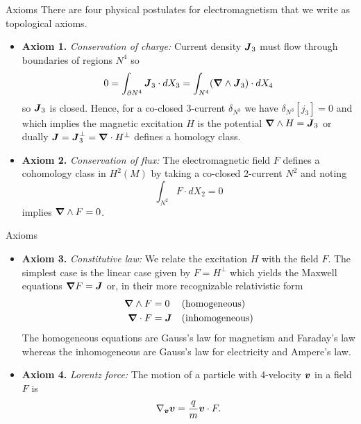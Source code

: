 \documentclass[UKenglish]{beamer}
\begin{document}
\begin{frame}{Axioms}
\vfill
There are four physical postulates for electromagnetism that we write as topological axioms.    
    \begin{itemize}
    \item{\bf{Axiom 1.}} \emph{Conservation of charge:} Current density $\boldsymbol{J}_3$ must flow through boundaries of regions $N^4$ so
    \[
    0=\int_{\partial N^4} \boldsymbol{J}_3\cdot dX_3=\int_{N^4} (\boldsymbol{\nabla} \wedge \boldsymbol{J}_3) \cdot dX_4
    \]
    so $\boldsymbol{J}_3$ is closed. Hence, for a co-closed 3-current $\delta_{N^3}$  we have $\delta_{N^3}[j_3]=0$ and which implies the magnetic excitation $H$ is the potential $\boldsymbol{\nabla} \wedge H=\boldsymbol{J}_3$ or dually $\boldsymbol{J}=\boldsymbol{J}_3^\perp = \boldsymbol{\nabla} \cdot H^\perp$ defines a homology class.
    \item{\bf{Axiom 2.}} \emph{Conservation of flux:} The electromagnetic field $F$ defines a cohomology class in $H^2(M)$ by taking a co-closed 2-current $N^2$ and noting
    \[
    \int_{N^2} F \cdot dX_2 = 0 
    \]
    implies $\boldsymbol{\nabla} \wedge F=0$.
\end{itemize}
\vfill
\end{frame}

\begin{frame}{Axioms}
\vfill
    \begin{itemize}
    \item{\bf{Axiom 3.}} \emph{Constitutive law:} We relate the excitation $H$ with the field $F$. The simplest case is the linear case given by $F=H^\perp$ which yields the Maxwell equations $\boldsymbol{\nabla} F = \boldsymbol{J}$ or, in their more recognizable relativistic form
    \begin{align*}
        \boldsymbol{\nabla} \wedge F &= 0 && \textrm{(homogeneous)}\\
        \boldsymbol{\nabla} \cdot F &= \boldsymbol{J} && \textrm{(inhomogeneous)}
    \end{align*}
    The homogeneous equations are Gauss's law for magnetism and Faraday's law whereas the inhomogeneous are Gauss's law for electricity and Ampere's law.
    \item{\bf{Axiom 4.}} \emph{Lorentz force:} The motion of a particle with 4-velocity $\boldsymbol{v}$ in a field $F$ is
    \[
    \nabla_{\boldsymbol{v}}\boldsymbol{v} = \frac{q}{m} \boldsymbol{v} \cdot F.
    \]
\end{itemize}
\vfill
\end{frame}
\end{document}
